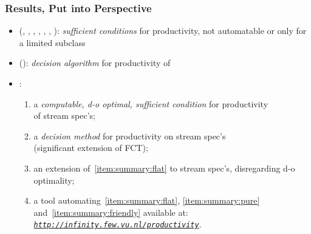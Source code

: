 \documentclass[10pt]{beamer}
\begin{document}
\begin{frame}%
  \frametitle{Results, Put into Perspective}

\vspace*{-0.5ex}
%
\begin{itemize}%
  \item
  (, , ,
   ,  
   , ,
   ):
  \emph{sufficient conditions} for productivity,
  not automatable or only for a limited subclass
    \vspace*{0.5ex}
  \item
   ():
  \emph{decision algorithm} for productivity of  
    \vspace*{0.5ex}
  \item
  :
    \begin{enumerate}
      \vspace*{0.75ex}
      \item\label{item:summary:flat}
        a \emph{computable, d-o optimal,
        sufficient condition} for productivity\\
        of  stream spec's;
        \vspace*{0.5ex}
      \item\label{item:summary:pure}
        a \emph{decision method} for productivity on 
         stream spec's\\
        (significant extension of FCT);
        \vspace*{0.5ex}
      \item\label{item:summary:friendly} 
        an extension of~\ref{item:summary:flat}
        to  stream spec's,
        disregarding d-o optimality;
        \vspace*{0.5ex}
      \item a tool automating~\ref{item:summary:flat}, \ref{item:summary:pure} 
        and~\ref{item:summary:friendly} available at:
        \href{http://localhost/productivity/}%
         {\emph{\tt http://infinity.few.vu.nl/productivity}}.
   \end{enumerate}
\end{itemize}

\end{frame}%
\end{document}
